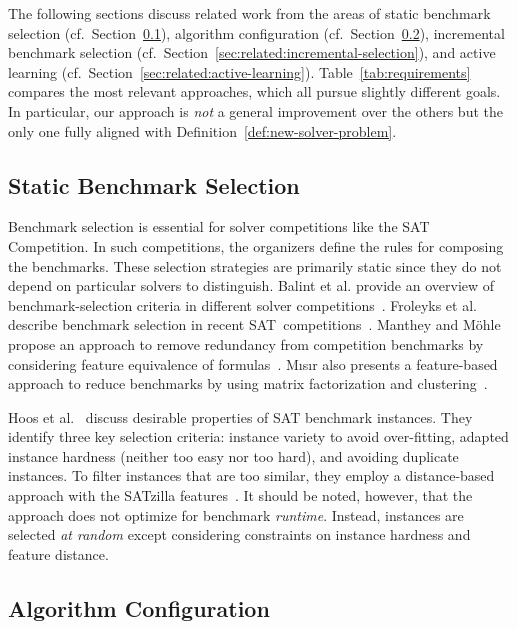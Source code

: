 \documentclass[sn-basic, Numbered]{sn-jnl} %
\begin{document}
The following sections discuss related work from the areas of static benchmark selection (cf.~Section~\ref{sec:related:static-selection}), algorithm configuration (cf.~Section~\ref{sec:related:algo-configuration}), incremental benchmark selection (cf.~Section~\ref{sec:related:incremental-selection}), and active learning (cf.~Section~\ref{sec:related:active-learning}).
Table~\ref{tab:requirements} compares the most relevant approaches, which all pursue slightly different goals.
In particular, our approach is \emph{not} a general improvement over the others but the only one fully aligned with Definition~\ref{def:new-solver-problem}.

\subsection{Static Benchmark Selection}
\label{sec:related:static-selection}

Benchmark selection is essential for solver competitions like the SAT Competition.
In such competitions, the organizers define the rules for composing the benchmarks.
These selection strategies are primarily static since they do not depend on particular solvers to distinguish.
Balint et al. provide an overview of benchmark-selection criteria in different solver competitions~\cite{balint2015overview}.
Froleyks et al. describe benchmark selection in recent SAT~competitions~\cite{FroleyksHIJS21}.
Manthey and Möhle propose an approach to remove redundancy from competition benchmarks by considering feature equivalence of formulas~\cite{manthey2016better}.
M{\i}s{\i}r also presents a feature-based approach to reduce benchmarks by using matrix factorization and clustering~\cite{misir2021benchmark}.

Hoos et al.~\cite{HoosKSS13} discuss desirable properties of SAT benchmark instances.
They identify three key selection criteria: instance variety to avoid over-fitting, adapted instance hardness (neither too easy nor too hard), and avoiding duplicate instances. 
To filter instances that are too similar, they employ a distance-based approach with the SATzilla features~\cite{XuHHL08,features}.
It should be noted, however, that the approach does not optimize for benchmark \emph{runtime}.
Instead, instances are selected \emph{at random} except considering constraints on instance hardness and feature distance.

\subsection{Algorithm Configuration}
\label{sec:related:algo-configuration}
\end{document}
